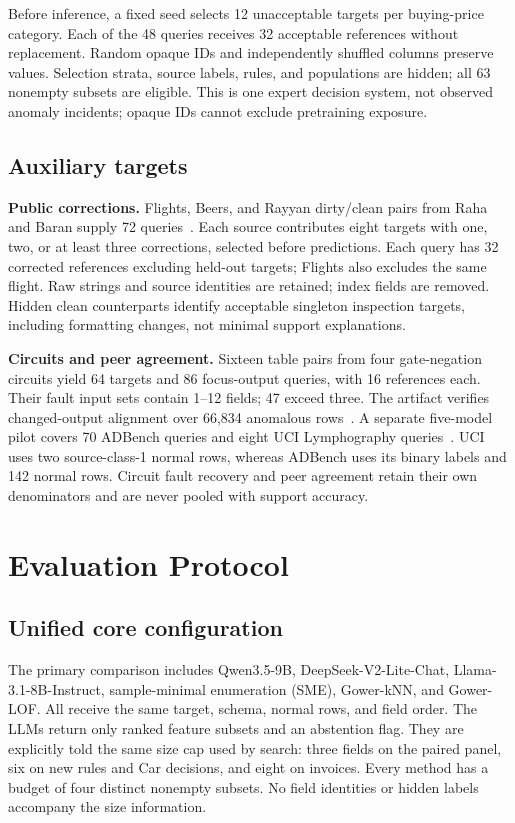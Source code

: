 \documentclass[conference]{IEEEtran}
\begin{document}
Before inference, a fixed seed selects 12 unacceptable targets per buying-price category. Each of the 48 queries receives 32 acceptable references without replacement. Random opaque IDs and independently shuffled columns preserve values. Selection strata, source labels, rules, and populations are hidden; all 63 nonempty subsets are eligible. This is one expert decision system, not observed anomaly incidents; opaque IDs cannot exclude pretraining exposure.

\subsection{Auxiliary targets}
\textbf{Public corrections.} Flights, Beers, and Rayyan dirty/clean pairs from Raha and Baran supply 72 queries~\cite{mahdavi2019raha,mahdavi2020baran}. Each source contributes eight targets with one, two, or at least three corrections, selected before predictions. Each query has 32 corrected references excluding held-out targets; Flights also excludes the same flight. Raw strings and source identities are retained; index fields are removed. Hidden clean counterparts identify acceptable singleton inspection targets, including formatting changes, not minimal support explanations.

\textbf{Circuits and peer agreement.} Sixteen table pairs from four gate-negation circuits yield 64 targets and 86 focus-output queries, with 16 references each. Their fault input sets contain 1--12 fields; 47 exceed three. The artifact verifies changed-output alignment over 66,834 anomalous rows~\cite{antwarg2024groundtruth}. A separate five-model pilot covers 70 ADBench queries and eight UCI Lymphography queries~\cite{han2022adbench}. UCI uses two source-class-1 normal rows, whereas ADBench uses its binary labels and 142 normal rows. Circuit fault recovery and peer agreement retain their own denominators and are never pooled with support accuracy.

\section{Evaluation Protocol}
\subsection{Unified core configuration}
The primary comparison includes Qwen3.5-9B, DeepSeek-V2-Lite-Chat, Llama-3.1-8B-Instruct, sample-minimal enumeration (SME), Gower-kNN, and Gower-LOF. All receive the same target, schema, normal rows, and field order. The LLMs return only ranked feature subsets and an abstention flag. They are explicitly told the same size cap used by search: three fields on the paired panel, six on new rules and Car decisions, and eight on invoices. Every method has a budget of four distinct nonempty subsets. No field identities or hidden labels accompany the size information.
\end{document}

